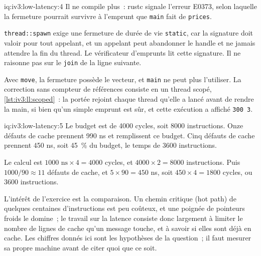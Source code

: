\begin{solution}{iq:iv3:low-latency:4}
Il ne compile plus~: rustc signale l'erreur E0373, selon laquelle la fermeture pourrait survivre à l'emprunt que \texttt{main} fait de \texttt{prices}.

\texttt{thread::spawn} exige une fermeture de durée de vie \texttt{\textquotesingle{}static}, car la signature doit valoir pour tout appelant, et un appelant peut abandonner le handle et ne jamais attendre la fin du thread. Le vérificateur d'emprunts lit cette signature. Il ne raisonne pas sur le \texttt{join} de la ligne suivante.

Avec \texttt{move}, la fermeture possède le vecteur, et \texttt{main} ne peut plus l'utiliser. La correction sans compteur de références consiste en un thread scopé, \cref{lst:iv3:ll:scoped}~: la portée rejoint chaque thread qu'elle a lancé avant de rendre la main, si bien qu'un simple emprunt est sûr, et cette exécution a affiché \texttt{300 3}.
\enlargethispage{-6\baselineskip}%
\label{lst:iv3:ll:scoped}
\end{solution}

\begin{solution}{iq:iv3:low-latency:5}
Le budget est de 4000 cycles, soit 8000 instructions. Onze défauts de cache prennent 990 ns et remplissent ce budget. Cinq défauts de cache prennent 450 ns, soit 45~\% du budget, le temps de 3600 instructions.

Le calcul est $1000\text{ ns} \times 4 = 4000$ cycles, et $4000 \times 2 = 8000$ instructions. Puis $1000 / 90 \approx 11$ défauts de cache, et $5 \times 90 = 450$ ns, soit $450 \times 4 = 1800$ cycles, ou 3600 instructions.

L'intérêt de l'exercice est la comparaison. Un chemin critique (hot path) de quelques centaines d'instructions est peu coûteux, et une poignée de pointeurs froids le domine~; le travail sur la latence consiste donc largement à limiter le nombre de lignes de cache qu'un message touche, et à savoir si elles sont déjà en cache. Les chiffres donnés ici sont les hypothèses de la question~; il faut mesurer sa propre machine avant de citer quoi que ce soit.

\end{solution}

